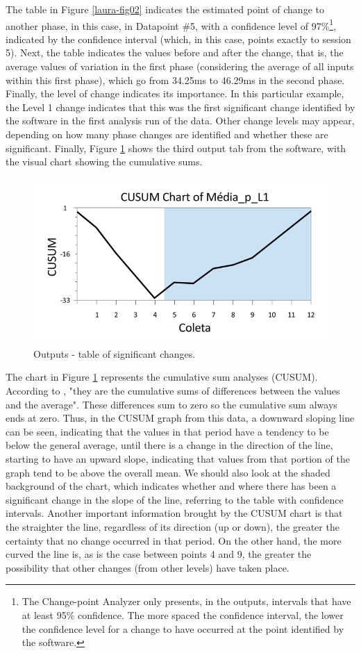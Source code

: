 The table in Figure \ref{laura-fig02} indicates the estimated point of change to another phase,
in this case, in Datapoint \#5, with a confidence level of 97\%\footnote{The
Change-point Analyzer only presents, in the outputs, intervals that have at
least 95\% confidence. The more spaced the confidence interval, the lower the
confidence level for a change to have occurred at the point identified by the
software.}, indicated by the confidence interval (which, in this case, points
exactly to session 5). Next, the table indicates the values before and after
the change, that is, the average values of variation in the first phase
(considering the average of all inputs within this first phase), which go from
34.25ms to 46.29ms in the second phase. Finally, the level of change indicates
its importance. In this particular example, the Level 1 change indicates that
this was the first significant change identified by the software in the first
analysis run of the data. Other change levels may appear, depending on how many
phase changes are identified and whether these are significant. Finally, Figure
\ref{laura-fig03} shows the third output tab from the software, with the visual chart showing
the cumulative sums.

\begin{figure}[h]
\centering
\includegraphics[width=0.7\linewidth]{imgs/lauracastilho22-image3.png}
\caption{Outputs - table of significant changes.} 
\label{laura-fig03}
\end{figure}

The chart in Figure \ref{laura-fig03} represents the cumulative sum analyses (CUSUM).
According to \citet[p.~6]{taylorwayne}, "they are the cumulative sums of differences
between the values and the average". These differences sum to zero so the
cumulative sum always ends at zero. Thus, in the CUSUM graph from this data, a
downward sloping line can be seen, indicating that the values in that period
have a tendency to be below the general average, until there is a change in the
direction of the line, starting to have an upward slope, indicating that values
from that portion of the graph tend to be above the overall mean. We should
also look at the shaded background of the chart, which indicates whether and
where there has been a significant change in the slope of the line, referring
to the table with confidence intervals. Another important information brought
by the CUSUM chart is that the straighter the line, regardless of its direction
(up or down), the greater the certainty that no change occurred in that period.
On the other hand, the more curved the line is, as is the case between points 4
and 9, the greater the possibility that other changes (from other levels) have
taken place.


